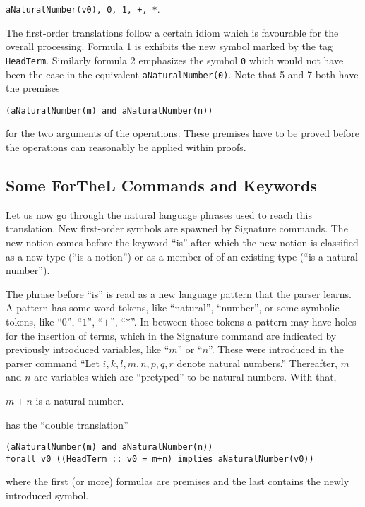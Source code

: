 \documentclass[11pt]{article}
\begin{document}
\verb_aNaturalNumber(v0), 0, 1, +, *_.

The first-order translations follow a certain idiom which
is favourable for the overall processing. Formula 1 is
exhibits
the new symbol marked by the tag \verb+HeadTerm+. Similarly
formula 2 emphasizes the symbol \verb+0+ which would not have been
the case in the equivalent \verb+aNaturalNumber(0)+.
Note that 5 and 7 both have the premises

\verb+(aNaturalNumber(m) and aNaturalNumber(n))+

\noindent for the two arguments of the operations. These premises have to
be proved before the operations can reasonably be applied within
proofs.

\subsection{Some ForTheL Commands and Keywords}

Let us now go through the natural language phrases used to 
reach this translation. New first-order symbols are spawned by
Signature commands. The new notion comes before the keyword ``is''
after which the new notion is classified as a new type (``is a notion'')
or as a member of of an existing type (``is a natural number'').

The phrase before ``is'' is read as a new language pattern that
the parser learns. A pattern has some word tokens, 
like ``natural'',
``number'', or some symbolic tokens, like 
``$0$'', ``$1$'', ``$+$'', ``$*$''.
In between those tokens a pattern may have holes for the insertion
of terms, which in the Signature command are indicated by previously
introduced variables, like ``$m$'' or ``$n$''. These were introduced in
the parser command ``Let $i,k,l,m,n,p,q,r$ denote natural numbers.''
Thereafter, $m$ and $n$ are variables which are ``pretyped'' to be
natural numbers. With that,
\begin{signature} $m + n$ is a natural number.
\end{signature}
has the ``double translation''
\begin{verbatim}
(aNaturalNumber(m) and aNaturalNumber(n))
forall v0 ((HeadTerm :: v0 = m+n) implies aNaturalNumber(v0))
\end{verbatim}
where the first (or more) formulas are premises and the last contains the
newly introduced symbol.
\end{document}
